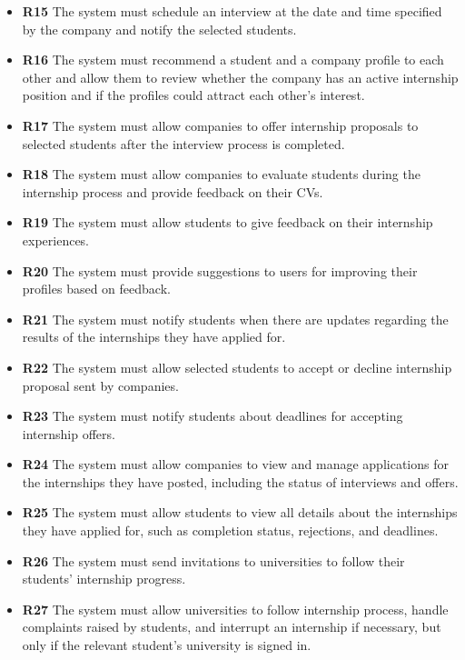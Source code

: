 \documentclass{article}
\begin{document}
\begin{itemize}
        \item \textbf{R15} The system must schedule an interview at the date and time specified by the company and notify the selected students.
        \item \textbf{R16} The system must recommend a student and a company profile to each other and allow them to review whether the company has an active internship position and if the profiles could attract each other's interest.
        \item \textbf{R17} The system must allow companies to offer internship proposals to selected students after the interview process is completed.
        \item \textbf{R18} The system must allow companies to evaluate students during the internship process and provide feedback on their CVs.
        \item \textbf{R19} The system must allow students to give feedback on their internship experiences.
        \item \textbf{R20} The system must provide suggestions to users for improving their profiles based on feedback.
        \item \textbf{R21} The system must notify students when there are updates regarding the results of the internships they have applied for.
        \item \textbf{R22} The system must allow selected students to accept or decline internship proposal sent by companies.    
         \item \textbf{R23} The system must notify students about deadlines for accepting internship offers.
        \item \textbf{R24} The system must allow companies to view and manage applications for the internships they have posted, including the status of interviews and offers.  
        \item \textbf{R25} The system must allow students to view all details about the internships they have applied for, such as completion status, rejections, and deadlines.
        \item \textbf{R26} The system must send invitations to universities to follow their students' internship progress.
        \item \textbf{R27} The system must allow universities to follow internship process, handle complaints raised by students, and interrupt an internship if necessary, but only if the relevant student's university is signed in.
        \end{itemize}
\end{document}
